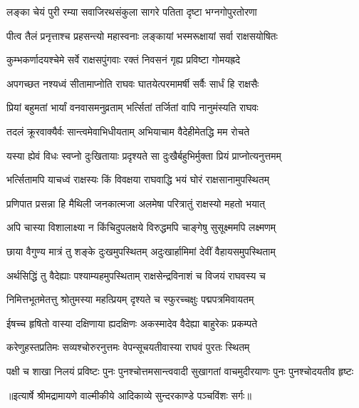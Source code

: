 \twolineshloka
{लङ्का चेयं पुरी रम्या सवाजिरथसंकुला}
{सागरे पतिता दृष्टा भग्नगोपुरतोरणा} %

\twolineshloka
{पीत्व तैलं प्रनृत्ताश्च प्रहसन्त्यो महास्वनाः}
{लङ्कायां भस्मरूक्षायां सर्वा राक्षसयोषितः} %

\twolineshloka
{कुम्भकर्णादयश्चेमे सर्वे राक्षसपुंगवाः}
{रक्तं निवसनं गृह्य प्रविष्टा गोमयह्रदे} %

\twolineshloka
{अपगच्छत नश्यध्वं सीतामाप्नोति राघवः}
{घातयेत्परमामर्षी सर्वैः सार्धं हि राक्षसैः} %

\twolineshloka
{प्रियां बहुमतां भार्यां वनवासमनुव्रताम्}
{भर्त्सितां तर्जितां वापि नानुमंस्यति राघवः} %

\twolineshloka
{तदलं क्रूरवाक्यैर्वः सान्त्वमेवाभिधीयताम्}
{अभियाचाम वैदेहीमेतद्धि मम रोचते} %

\twolineshloka
{यस्या ह्येवं विधः स्वप्नो दुःखितायाः प्रदृश्यते}
{सा दुःखैर्बहुभिर्मुक्ता प्रियं प्राप्नोत्यनुत्तमम्} %

\twolineshloka
{भर्त्सितामपि याचध्वं राक्षस्यः किं विवक्षया}
{राघवाद्धि भयं घोरं राक्षसानामुपस्थितम्} %

\twolineshloka
{प्रणिपात प्रसन्ना हि मैथिली जनकात्मजा}
{अलमेषा परित्रातुं राक्षस्यो महतो भयात्} %

\twolineshloka
{अपि चास्या विशालाक्ष्या न किंचिदुपलक्षये}
{विरुद्धमपि चाङ्गेषु सुसूक्ष्ममपि लक्ष्मणम्} %

\twolineshloka
{छाया वैगुण्य मात्रं तु शङ्के दुःखमुपस्थितम्}
{अदुःखार्हामिमां देवीं वैहायसमुपस्थिताम्} %

\twolineshloka
{अर्थसिद्धिं तु वैदेह्याः पश्याम्यहमुपस्थिताम्}
{राक्षसेन्द्रविनाशं च विजयं राघवस्य च} %

\twolineshloka
{निमित्तभूतमेतत्तु श्रोतुमस्या महत्प्रियम्}
{दृश्यते च स्फुरच्चक्षुः पद्मपत्रमिवायतम्} %

\twolineshloka
{ईषच्च हृषितो वास्या दक्षिणाया ह्यदक्षिणः}
{अकस्मादेव वैदेह्या बाहुरेकः प्रकम्पते} %

\twolineshloka
{करेणुहस्तप्रतिमः सव्यश्चोरुरनुत्तमः}
{वेपन्सूचयतीवास्या राघवं पुरतः स्थितम्} %

\fourlineindentedshloka
{पक्षी च शाखा निलयं प्रविष्टः}
{ पुनः पुनश्चोत्तमसान्त्ववादी}
{सुखागतां वाचमुदीरयाणः}
{ पुनः पुनश्चोदयतीव हृष्टः} %


{॥इत्यार्षे श्रीमद्रामायणे वाल्मीकीये आदिकाव्ये सुन्दरकाण्डे पञ्चविंशः सर्गः॥}

